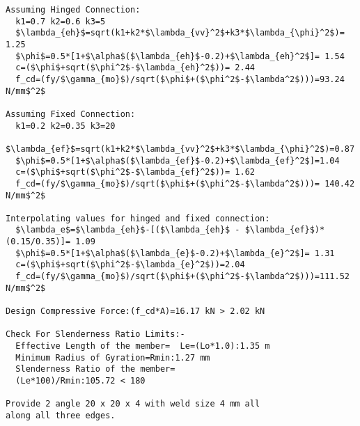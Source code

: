 \documentclass[preprint]{elsarticle}
\begin{document}
\begin{verbatim}
Assuming Hinged Connection:
  k1=0.7 k2=0.6 k3=5
  $\lambda_{eh}$=sqrt(k1+k2*$\lambda_{vv}^2$+k3*$\lambda_{\phi}^2$)= 1.25
  $\phi$=0.5*[1+$\alpha$($\lambda_{eh}$-0.2)+$\lambda_{eh}^2$]= 1.54
  c=($\phi$+sqrt($\phi^2$-$\lambda_{eh}^2$))= 2.44
  f_cd=(fy/$\gamma_{mo}$)/sqrt($\phi$+($\phi^2$-$\lambda^2$)))=93.24 N/mm$^2$ 

Assuming Fixed Connection:
  k1=0.2 k2=0.35 k3=20
  $\lambda_{ef}$=sqrt(k1+k2*$\lambda_{vv}^2$+k3*$\lambda_{\phi}^2$)=0.87
  $\phi$=0.5*[1+$\alpha$($\lambda_{ef}$-0.2)+$\lambda_{ef}^2$]=1.04
  c=($\phi$+sqrt($\phi^2$-$\lambda_{ef}^2$))= 1.62
  f_cd=(fy/$\gamma_{mo}$)/sqrt($\phi$+($\phi^2$-$\lambda^2$)))= 140.42 N/mm$^2$ 

Interpolating values for hinged and fixed connection:
  $\lambda_e$=$\lambda_{eh}$-[($\lambda_{eh}$ - $\lambda_{ef}$)*(0.15/0.35)]= 1.09
  $\phi$=0.5*[1+$\alpha$($\lambda_{e}$-0.2)+$\lambda_{e}^2$]= 1.31
  c=($\phi$+sqrt($\phi^2$-$\lambda_{e}^2$))=2.04
  f_cd=(fy/$\gamma_{mo}$)/sqrt($\phi$+($\phi^2$-$\lambda^2$)))=111.52 N/mm$^2$ 

Design Compressive Force:(f_cd*A)=16.17 kN > 2.02 kN

Check For Slenderness Ratio Limits:- 
  Effective Length of the member=  Le=(Lo*1.0):1.35 m 
  Minimum Radius of Gyration=Rmin:1.27 mm
  Slenderness Ratio of the member= 
  (Le*100)/Rmin:105.72 < 180 

Provide 2 angle 20 x 20 x 4 with weld size 4 mm all 
along all three edges.
\end{verbatim}
\end{document}
